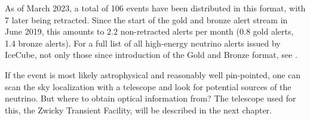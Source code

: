 As of March 2023, a total of 106 events have been distributed in this format, with 7 later being retracted. Since the start of the gold and bronze alert stream in June 2019, this amounts to $2.2$ non-retracted alerts per month (0.8 gold alerts, 1.4 bronze alerts). For a full list of all high-energy neutrino alerts issued by IceCube, not only those since introduction of the Gold and Bronze format, see \cite{Abbasi2023}.

If the event is most likely astrophysical and reasonably well pin-pointed, one can scan the sky localization with a telescope and look for potential sources of the neutrino. But where to obtain optical information from? The telescope used for this, the Zwicky Transient Facility, will be described in the next chapter.




